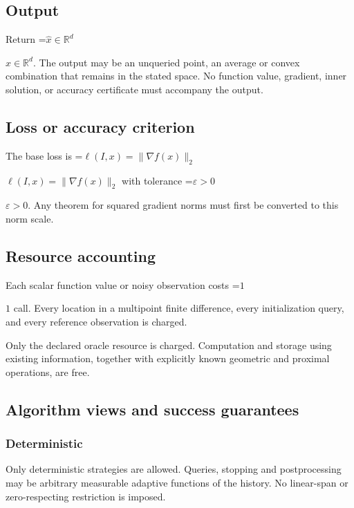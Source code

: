 \documentclass[10pt,a4paper]{article}
\newcommand{\AtlasMath}[1]{\par\begingroup\centering\setbox0=\hbox{$\displaystyle #1$}\ifdim\wd0>1.4\linewidth\typeout{ATLAS WIDE FORMULA: \the\wd0}\fi\ifdim\wd0>\linewidth\resizebox{\linewidth}{!}{\box0}\else\box0\fi\par\endgroup}
\newcommand{\AtlasInlineMath}[1]{\begingroup\setbox0=\hbox{$#1$}\ifdim\wd0>.4\linewidth\endgroup\AtlasMath{#1}\else\endgroup$#1$\fi}
\begin{document}
\subsection{Output}


Return \AtlasInlineMath{\widehat{x}\in \mathbb{R}^d}. The output may be an unqueried point, an average or convex combination that remains in the stated space. No function value, gradient, inner solution, or accuracy certificate must accompany the output.



\subsection{Loss or accuracy criterion}


The base loss is \AtlasInlineMath{\ell(I,x)=\|\nabla f(x)\|_2} with tolerance \AtlasInlineMath{\varepsilon>0}. Any theorem for squared gradient norms must first be converted to this norm scale.



\subsection{Resource accounting}


Each scalar function value or noisy observation costs \AtlasInlineMath{1} call. Every location in a multipoint finite difference, every initialization query, and every reference observation is charged.



Only the declared oracle resource is charged. Computation and storage using existing information, together with explicitly known geometric and proximal operations, are free.



\subsection{Algorithm views and success guarantees}


\subsubsection{Deterministic}


Only deterministic strategies are allowed. Queries, stopping and postprocessing may be arbitrary measurable adaptive functions of the history. No linear-span or zero-respecting restriction is imposed.
\end{document}
